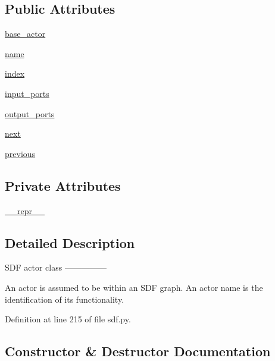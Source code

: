 \subsection*{Public Attributes}
\begin{DoxyCompactItemize}
\item 
\hyperlink{classsylva_1_1base_1_1sdf_1_1actor_ae9b1e79fcf5e63107ae89ba68ecc4743}{base\+\_\+actor}
\item 
\hyperlink{classsylva_1_1base_1_1sdf_1_1actor_a2ef1df32bd9d891a43df5b59cdc2f33b}{name}
\item 
\hyperlink{classsylva_1_1base_1_1sdf_1_1actor_a876d41fa48c3a1a6d62fc3054b321f08}{index}
\item 
\hyperlink{classsylva_1_1base_1_1sdf_1_1actor_aad8739c0c518eb7017949d07effee1b2}{input\+\_\+ports}
\item 
\hyperlink{classsylva_1_1base_1_1sdf_1_1actor_aa145dfb1abe65febe991235fb715f44e}{output\+\_\+ports}
\item 
\hyperlink{classsylva_1_1base_1_1sdf_1_1actor_aa182473926fcf5c58d284b5f23351629}{next}
\item 
\hyperlink{classsylva_1_1base_1_1sdf_1_1actor_ac3043c8e8aa528bb6d00465b0a1964d3}{previous}
\end{DoxyCompactItemize}
\subsection*{Private Attributes}
\begin{DoxyCompactItemize}
\item 
\hyperlink{classsylva_1_1base_1_1sdf_1_1actor_a3f5b51bf4c0ca79d2086bc8036b4651e}{\+\_\+\+\_\+repr\+\_\+\+\_\+}
\end{DoxyCompactItemize}


\subsection{Detailed Description}
\begin{DoxyVerb}  SDF actor class
  ---------------

  An actor is assumed to be within an SDF graph.
  An actor name is the identification of its functionality.
\end{DoxyVerb}
 

Definition at line 215 of file sdf.\+py.



\subsection{Constructor \& Destructor Documentation}
\mbox{\label{classsylva_1_1base_1_1sdf_1_1actor_a54b20a91faff7f7d083257c95d6768d0}} 
